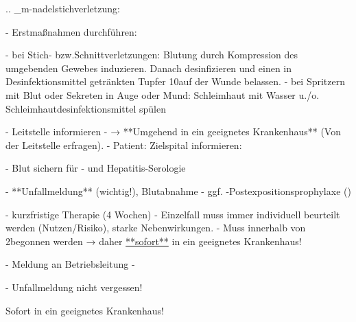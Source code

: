 
.. _m-nadelstichverletzung:


\begin{itemize}
    -   Erstmaßnahmen durchführen: \nocite{OeAG2007}
    \begin{itemize}
        -   bei Stich- bzw.Schnittverletzungen:
        Blutung durch Kompression des umgebenden
        Gewebes induzieren. Danach desinfizieren und einen
        in Desinfektionsmittel getränkten Tupfer 10\Min*
        auf der Wunde belassen.
        -   bei Spritzern mit Blut oder Sekreten in Auge oder Mund:
        Schleimhaut mit Wasser u./o. Schleimhautdesinfektionsmittel spülen
    \end{itemize}
    -   Leitstelle informieren
    -   → **Umgehend in ein
    geeignetes Krankenhaus** (Von der Leitstelle erfragen).
    -   Patient: Zielspital informieren:
    \begin{itemize}
        -   Blut sichern für - und Hepatitis-Serologie
    \end{itemize}
    -    **Unfallmeldung**  (wichtig!), Blutabnahme
    -   ggf. -Postexpositionsprophylaxe ()
    \begin{itemize}
        -   kurzfristige Therapie (4 Wochen)
        -   Einzelfall muss immer individuell beurteilt werden
        (Nutzen/Risiko), starke Nebenwirkungen.
        -   Muss innerhalb von 2\Hour* begonnen werden → daher
        \underline{**sofort**} in ein geeignetes Krankenhaus!
    \end{itemize}
    -   Meldung an Betriebsleitung
    -   
\end{itemize}

\begin{Danger}
  -   Unfallmeldung nicht vergessen!
  
  Sofort in ein geeignetes Krankenhaus!
\end{Danger}
